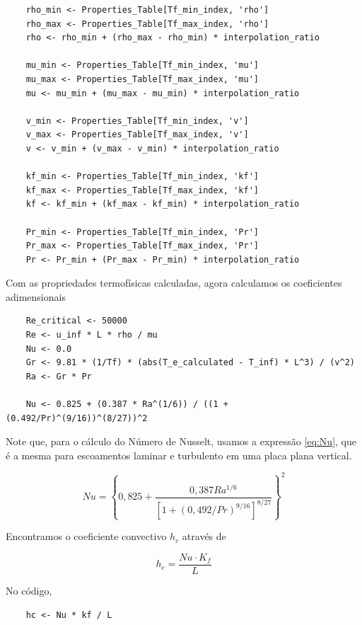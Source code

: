 \documentclass[12pt]{scrartcl}
\begin{document}
\begin{lstlisting}
    rho_min <- Properties_Table[Tf_min_index, 'rho']
    rho_max <- Properties_Table[Tf_max_index, 'rho']
    rho <- rho_min + (rho_max - rho_min) * interpolation_ratio
    
    mu_min <- Properties_Table[Tf_min_index, 'mu']
    mu_max <- Properties_Table[Tf_max_index, 'mu']
    mu <- mu_min + (mu_max - mu_min) * interpolation_ratio
    
    v_min <- Properties_Table[Tf_min_index, 'v']
    v_max <- Properties_Table[Tf_max_index, 'v']
    v <- v_min + (v_max - v_min) * interpolation_ratio
    
    kf_min <- Properties_Table[Tf_min_index, 'kf']
    kf_max <- Properties_Table[Tf_max_index, 'kf']
    kf <- kf_min + (kf_max - kf_min) * interpolation_ratio
    
    Pr_min <- Properties_Table[Tf_min_index, 'Pr']
    Pr_max <- Properties_Table[Tf_max_index, 'Pr']
    Pr <- Pr_min + (Pr_max - Pr_min) * interpolation_ratio
\end{lstlisting}

Com as propriedades termofísicas calculadas, agora calculamos os coeficientes
adimensionais

\begin{lstlisting}
    Re_critical <- 50000
    Re <- u_inf * L * rho / mu
    Nu <- 0.0
    Gr <- 9.81 * (1/Tf) * (abs(T_e_calculated - T_inf) * L^3) / (v^2)
    Ra <- Gr * Pr

    Nu <- 0.825 + (0.387 * Ra^(1/6)) / ((1 + (0.492/Pr)^(9/16))^(8/27))^2
\end{lstlisting}

Note que, para o cálculo do Número de Nusselt, usamos a expressão \eqref{eq:Nu}, que 
é a mesma para escoamentos laminar e turbulento em uma placa plana vertical.

\begin{equation}\label{eq:Nu}
    Nu = \left\{ 0,825 + \frac{0,387Ra^{1/6}}{\left[1 + \left(0,492 / Pr\right)^{9/16}\right]^{8/27}} \right\}^2
\end{equation}

Encontramos o coeficiente convectivo $h_c$ através de 

\begin{equation}\label{eq:hc_Nu}
    h_c = \frac{Nu \cdot K_f}{L}
\end{equation}

No código, 

\begin{lstlisting}
    hc <- Nu * kf / L
\end{lstlisting}
\end{document}
